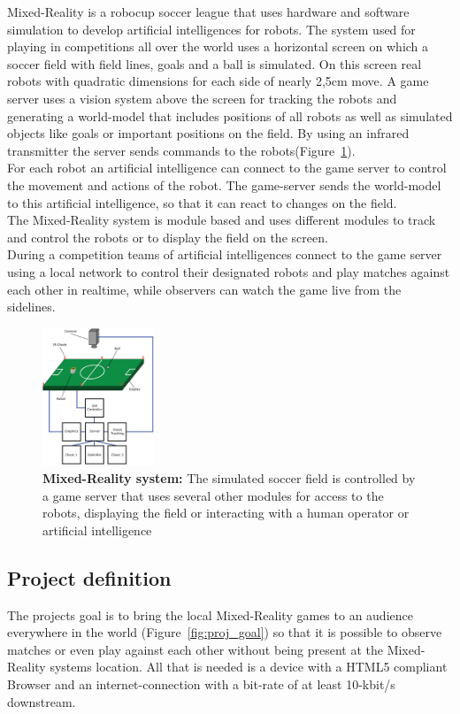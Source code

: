 \documentclass[journal]{IEEEtran}
\begin{document}
Mixed-Reality is a robocup soccer league that uses hardware and software
simulation to develop artificial intelligences for robots. The system used for
playing in competitions all over the world\cite{gerndt-case-study} uses a
horizontal screen on which a soccer field with field lines, goals and a ball is
simulated. On this screen real robots with quadratic dimensions for each side of
nearly 2,5cm move. A game server uses a vision system above the screen for
tracking the robots and generating a world-model that includes positions of all
robots as well as simulated objects like goals or important positions on the
field. By using an infrared transmitter the server sends commands to the
robots(Figure~\ref{fig:mr_system}).\\
For each robot an artificial intelligence can connect to the game server to
control the movement and actions of the robot. The game-server sends the
world-model to this artificial intelligence, so that it can react to changes on the field.\\
The Mixed-Reality system is module based and uses different modules to track and
control the robots or to display the field on the screen.\\
During a competition teams of artificial intelligences connect to the game
server using a local network to control their designated robots and play matches
against each other in realtime\cite{mr-web-northernstars}, while observers can
watch the game live from the sidelines.
\begin{figure}[!t]
    \centering
    \includegraphics[width=0.3\textwidth]{mr_system.png}
    \caption{\textbf{Mixed-Reality system:} The simulated soccer field is
    controlled by a game server that uses several other modules for access to the
    robots, displaying the field or interacting with a human operator or
    artificial intelligence}
    \label{fig:mr_system}
\end{figure}
\subsection{Project definition}
The projects goal is to bring the local Mixed-Reality games to an audience
everywhere in the world (Figure~\ref{fig:proj_goal}) so that it is possible to
observe matches or even play against each other without being present at the
Mixed-Reality systems location. All that is needed is a device with a HTML5
compliant Browser and an internet-connection with a bit-rate of at least 10-kbit/s downstream.
\end{document}
